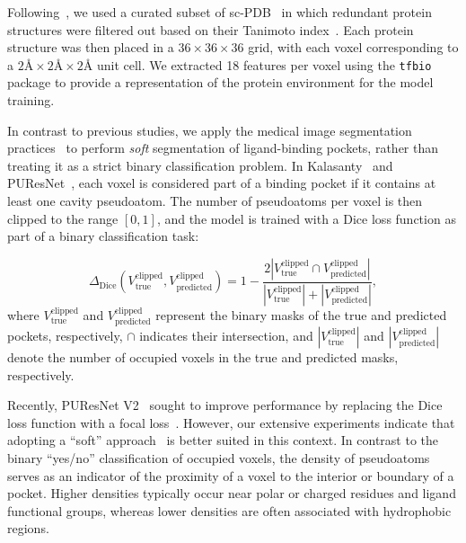 \documentclass[10pt,conference]{IEEEtran}
\begin{document}
Following~\cite{kandel2021puresnet}, we used a curated subset of sc-PDB~\cite{desaphy2015scpdb} in which redundant protein structures were filtered out based on their Tanimoto index~\cite{bajusz2015tanimoto}. Each protein structure was then placed in a $36 \times 36 \times 36$ grid, with each voxel corresponding to a $2\text{\AA} \times 2\text{\AA} \times 2\text{\AA}$ unit cell. We extracted 18 features per voxel using the \texttt{tfbio}~\cite{tfbio2018} package to provide a representation of the protein environment for the model training.


In contrast to previous studies, we apply the medical image segmentation practices~\cite{gros2021softseg,wang2023dice1,milletari2016vnet} to perform \textit{soft} segmentation of ligand-binding pockets, rather than treating it as a strict binary classification problem. In Kalasanty~\cite{stepniewska2020improving} and PUResNet~\cite{kandel2021puresnet}, each voxel is considered part of a binding pocket if it contains at least one cavity pseudoatom. The number of pseudoatoms per voxel is then clipped to the range $[0,1]$, and the model is trained with a Dice loss function as part of a binary classification task:

\begin{equation}
\Delta_{\text{Dice}}\left(V^{\text{clipped}}_{\text{true}}, V^{\text{clipped}}_{\text{predicted}}\right)
= 1
- \frac{2 \left\lvert V^{\text{clipped}}_{\text{true}} \cap V^{\text{clipped}}_{\text{predicted}} \right\rvert}
       {\left\lvert V^{\text{clipped}}_{\text{true}} \right\rvert 
        + \left\lvert V^{\text{clipped}}_{\text{predicted}} \right\rvert},
\label{Dice_Eqn}
\end{equation}
where $V^{\text{clipped}}_{\text{true}}$ and $V^{\text{clipped}}_{\text{predicted}}$ represent the binary masks of the true and predicted pockets, respectively, $\cap$ indicates their intersection, and $\left\lvert V^{\text{clipped}}_{\text{true}} \right\rvert$ and $\left\lvert V^{\text{clipped}}_{\text{predicted}} \right\rvert$ denote the number of occupied voxels in the true and predicted masks, respectively.

Recently, PUResNet V2~\cite{jeevan2024puresnetv2} sought to improve performance by replacing the Dice loss function with a focal loss~\cite{lin2017focal}. However, our extensive experiments indicate that adopting a ``soft'' approach~\cite{gros2021softseg,wang2023dice1,milletari2016vnet} is better suited in this context. In contrast to the binary ``yes/no'' classification of occupied voxels, the density of pseudoatoms serves as an indicator of the proximity of a voxel to the interior or boundary of a pocket. Higher densities typically occur near polar or charged residues and ligand functional groups, whereas lower densities are often associated with hydrophobic regions.
\end{document}
